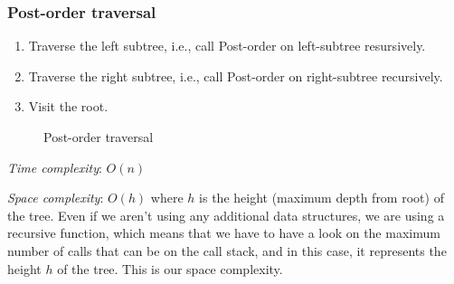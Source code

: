 \documentclass[a4paper,11pt]{book}
\begin{document}
\subsubsection{Post-order traversal}
        \begin{enumerate}
            \item Traverse the left subtree, i.e., call Post-order on left-subtree resursively.
            \item Traverse the right subtree, i.e., call Post-order on right-subtree recursively.
            \item Visit the root.
        \end{enumerate}
        \begin{figure}[ht]
        \begin{center}
        \vspace{6mm}

        \end{center}
        \caption{Post-order traversal}
        \end{figure}
\noindent \textit{Time complexity}: $O(n)$

\noindent \textit{Space complexity}: $O(h)$ where $h$ is the height (maximum depth from root) of the tree. Even if we aren't using any additional data structures, we are using a recursive function, which means that we have to have a look on the maximum number of calls that can be on the call stack, and in this case, it represents the height $h$ of the tree. This is our space complexity.
\end{document}
